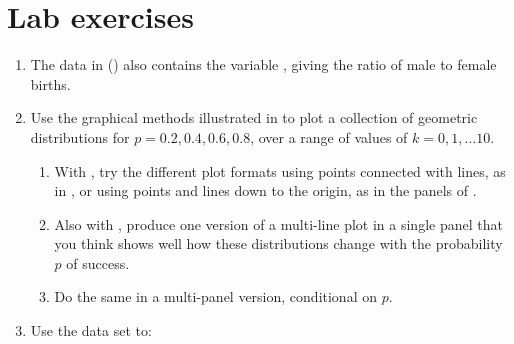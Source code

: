 \documentclass[11pt]{book}
\begin{document}
\section{Lab exercises}\label{sec:ch03-labs}

\begin{enumerate}
  \item The  data in  () also 
    contains the variable
    , giving the ratio of male to female births.
    
  \item Use the graphical methods illustrated in 
  to plot a collection of geometric distributions for $p = 0.2, 0.4, 0.6, 0.8$,
  over a range of values of $k = 0, 1, \dots 10$.
  \begin{enumerate}
    \item With , try the different plot formats using points
    connected with lines, as in , or using points
    and lines down to the origin, as in the panels of .
    \item Also with , produce one version of a multi-line plot
    in a single panel that you think shows well how these distributions change
    with the probability $p$ of success.
    \item Do the same in a multi-panel version, conditional on $p$.
  \end{enumerate}
  
  \item Use the data set  to:
  

\end{enumerate}
\end{document}
